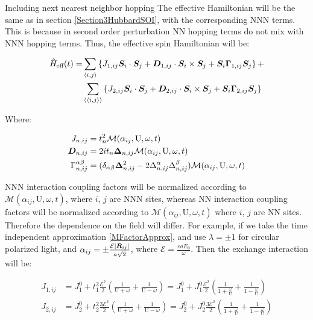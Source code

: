 \begin{section}{Including next nearest neighbor hopping}
The effective Hamiltonian will be the same as in section \ref{Section3HubbardSOI}, with the corresponding NNN terms. This is because in second order perturbation NN hopping terms do not mix with NNN hopping terms. Thus, the effective spin Hamiltonian will be:

\begin{align}
\hat{H}_{\text{eff}}(t) = &\sum_{\langle i,j \rangle} \left\{ J_{1,ij}\boldsymbol{S}_i\cdot\boldsymbol{S}_j + \boldsymbol{D}_{1,ij} \cdot\boldsymbol{S}_i \times \boldsymbol{S}_j + \boldsymbol{S}_i\boldsymbol{\Gamma}_{1,ij}\boldsymbol{S}_j\right\} + \nonumber \\
&\sum_{\langle \langle i,j \rangle \rangle} \left\{ J_{2,ij}\boldsymbol{S}_i\cdot\boldsymbol{S}_j + \boldsymbol{D}_{2,ij}\cdot \boldsymbol{S}_i \times \boldsymbol{S}_j + \boldsymbol{S}_i\boldsymbol{\Gamma}_{2,ij}\boldsymbol{S}_j\right\}
\end{align}

Where:

\begin{align}
J_{n,ij} &= t_n^2\mathcal{M}(\alpha_{ij}, \text{U}, \omega, t) \label{JGeneral} \\
\boldsymbol{D}_{n,ij} &= 2it_n \boldsymbol{\Delta}_{n,ij}\mathcal{M}(\alpha_{ij}, \text{U}, \omega, t) \label{DGeneral} \\
\Gamma_{n,ij}^{\alpha \beta} &= (\delta_{\alpha \beta} \boldsymbol{\Delta}_{n,ij}^2 - 2\Delta_{n,ij}^\alpha\Delta_{n,ij}^\beta )\mathcal{M}(\alpha_{ij}, \text{U}, \omega, t) \label{GammaGeneral}
\end{align}

NNN interaction coupling factors will be normalized according to $\mathcal{M}(\alpha_{ij}, \text{U}, \omega, t)$, where $i$, $j$ are NNN sites, whereas NN interaction coupling factors will be normalized according to $\mathcal{M}(\alpha_{ij}, \text{U}, \omega, t)$ where $i$, $j$ are NN sites. Therefore the dependence on the field will differ. For example, if we take the time independent approximation \ref{MFactorApprox}, and use $\lambda = \pm 1$ for circular polarized light, and $\alpha_{ij} = \pm\frac{\mathcal{E}|\boldsymbol{R}_{ij}|}{a\sqrt{2}}$, where $\mathcal{E} = \frac{eaE_0}{\omega}$. Then the exchange interaction will be:

\begin{align*}
J_{1,ij} &= J_1^0 + t_1^2 \frac{\mathcal{E}^2}{2} \left( \frac{1}{\text{U}+\omega} + \frac{1}{\text{U}-\omega} \right) = J_1^0 + J_1^0 \frac{\mathcal{E}^2}{2} \left( \frac{1}{1+\frac{\omega}{\text{U}}} + \frac{1}{1-\frac{\omega}{\text{U}}} \right) \\
J_{2,ij} &= J_2^0 + t_2^2 \frac{3\mathcal{E}^2}{2} \left( \frac{1}{\text{U}+\omega} + \frac{1}{\text{U}-\omega} \right) = J_2^0 + J_2^0 \frac{3\mathcal{E}^2}{2} \left( \frac{1}{1+\frac{\omega}{\text{U}}} + \frac{1}{1-\frac{\omega}{\text{U}}} \right) \\
\end{align*}


\end{section}
